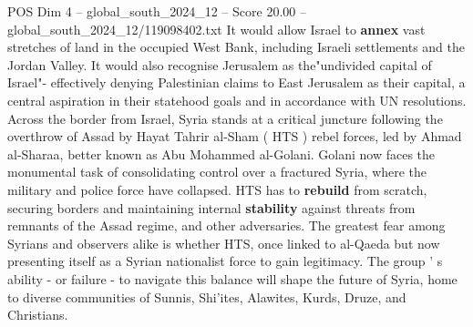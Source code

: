 \begin{textsample}{POS Dim 4 – global\_south\_2024\_12 – Score 20.00 – global\_south\_2024\_12/119098402.txt}
It would allow Israel to \textbf{annex} vast stretches of land in the occupied West Bank, including Israeli settlements and the Jordan Valley.
It would also recognise Jerusalem as the"undivided capital of Israel"- effectively denying Palestinian claims to East Jerusalem as their capital, a central aspiration in their statehood goals and in accordance with UN resolutions.
Across the border from Israel, Syria stands at a critical juncture following the overthrow of Assad by Hayat Tahrir al-Sham ( HTS ) rebel forces, led by Ahmad al-Sharaa, better known as Abu Mohammed al-Golani.
Golani now faces the monumental task of consolidating control over a fractured Syria, where the military and police force have collapsed.
HTS has to \textbf{rebuild} from scratch, securing borders and maintaining internal \textbf{stability} against threats from remnants of the Assad regime, and other adversaries.
The greatest fear among Syrians and observers alike is whether HTS, once linked to al-Qaeda but now presenting itself as a Syrian nationalist force to gain legitimacy.
The group ' s ability - or failure - to navigate this balance will shape the future of Syria, home to diverse communities of Sunnis, Shi'ites, Alawites, Kurds, Druze, and Christians.

\end{textsample}
